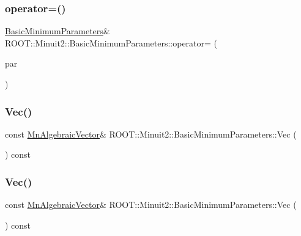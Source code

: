 \subsubsection{\texorpdfstring{operator=()}{operator=()}\hspace{0.1cm}{\footnotesize\ttfamily [3/3]}}
{\footnotesize\ttfamily \mbox{\hyperlink{classROOT_1_1Minuit2_1_1BasicMinimumParameters}{Basic\+Minimum\+Parameters}}\& R\+O\+O\+T\+::\+Minuit2\+::\+Basic\+Minimum\+Parameters\+::operator= (\begin{DoxyParamCaption}\item[{const \mbox{\hyperlink{classROOT_1_1Minuit2_1_1BasicMinimumParameters}{Basic\+Minimum\+Parameters}} \&}]{par }\end{DoxyParamCaption})\hspace{0.3cm}{\ttfamily [inline]}}

\mbox{\label{classROOT_1_1Minuit2_1_1BasicMinimumParameters_ae8dc429aa9491e545efd916d4f72f8dd}} 
\subsubsection{\texorpdfstring{Vec()}{Vec()}\hspace{0.1cm}{\footnotesize\ttfamily [1/3]}}
{\footnotesize\ttfamily const \mbox{\hyperlink{namespaceROOT_1_1Minuit2_a62ed97730a1ca8d3fbaec64a19aa11c9}{Mn\+Algebraic\+Vector}}\& R\+O\+O\+T\+::\+Minuit2\+::\+Basic\+Minimum\+Parameters\+::\+Vec (\begin{DoxyParamCaption}{ }\end{DoxyParamCaption}) const\hspace{0.3cm}{\ttfamily [inline]}}

\mbox{\label{classROOT_1_1Minuit2_1_1BasicMinimumParameters_ae8dc429aa9491e545efd916d4f72f8dd}} 
\subsubsection{\texorpdfstring{Vec()}{Vec()}\hspace{0.1cm}{\footnotesize\ttfamily [2/3]}}
{\footnotesize\ttfamily const \mbox{\hyperlink{namespaceROOT_1_1Minuit2_a62ed97730a1ca8d3fbaec64a19aa11c9}{Mn\+Algebraic\+Vector}}\& R\+O\+O\+T\+::\+Minuit2\+::\+Basic\+Minimum\+Parameters\+::\+Vec (\begin{DoxyParamCaption}{ }\end{DoxyParamCaption}) const\hspace{0.3cm}{\ttfamily [inline]}}

